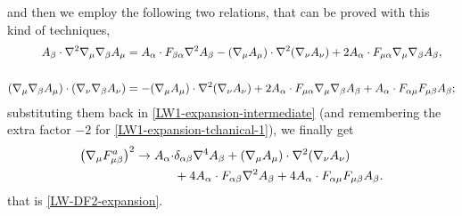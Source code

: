 and then we employ the following two relations, that can be proved with this kind of techniques,
\begin{align}
\label{LW1-expansion-tchanical-1}
A_\beta \cdot { \mathcal{\nabla} }^2 { \mathcal{\nabla} }_\mu { \mathcal{\nabla} }_\beta A_\mu
		& =	 A_\alpha \cdot F_{ \beta \alpha } { \mathcal{\nabla} }^2 A_\beta
			- ({ \mathcal{\nabla} }_\mu A_\mu) \cdot { \mathcal{\nabla} }^2 ({ \mathcal{\nabla} }_\nu A_\nu ) 
			+ 2 A_\alpha \cdot F_{ \mu \alpha } { \mathcal{\nabla} }_\mu  { \mathcal{\nabla} }_\beta A_\beta, 
			\\
\nonumber			\\
({ \mathcal{\nabla} }_\mu { \mathcal{\nabla} }_\beta A_\mu)\cdot ({ \mathcal{\nabla} }_\nu { \mathcal{\nabla} }_\beta A_\nu)	
\label{LW1-expansion-tchanical-2}			
		& = 	- ({ \mathcal{\nabla} }_\mu A_\mu) \cdot { \mathcal{\nabla} }^2 ({ \mathcal{\nabla} }_\nu A_\nu ) 
				+ 2 A_\alpha \cdot F_{\mu \alpha } { \mathcal{\nabla} }_\mu { \mathcal{\nabla} }_\beta A_\beta  
				+ A_\alpha \cdot F_{ \alpha \mu } F_{ \mu \beta } A_\beta;
\end{align}
substituting them back in \eqref{LW1-expansion-intermediate} (and remembering the extra factor $-2$ for \eqref{LW1-expansion-tchanical-1}), we finally get
\begin{equation}
\begin{split}
\left({ \mathcal{\nabla} }_\mu F_{\mu \beta}^a \right)^2  
 \rightarrow 
 	A_\alpha \cdot &\delta_{\alpha \beta} { \mathcal{\nabla} }^4 A_\beta
 	 + ({ \mathcal{\nabla} }_\mu A_\mu) \cdot { \mathcal{\nabla} }^2 ({ \mathcal{\nabla} }_\nu A_\nu ) \\
 	& + 4 A_\alpha \cdot F_{ \alpha \beta} { \mathcal{\nabla} }^2 A_\beta
 	+ 4 A_\alpha \cdot F_{ \alpha \mu} F_{\mu \beta } A_\beta.
\end{split}
\end{equation}
that is \eqref{LW-DF2-expansion}.




